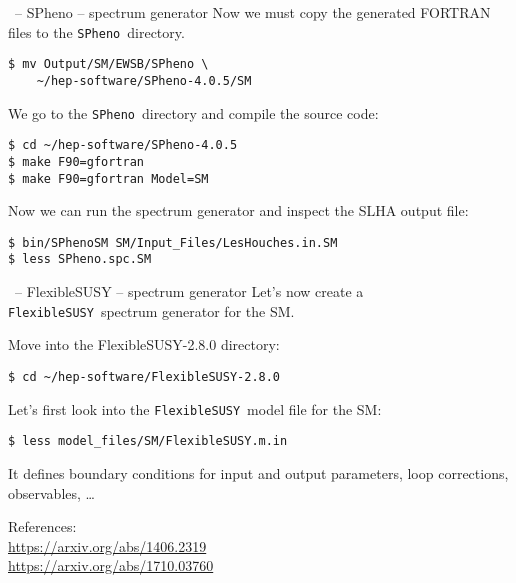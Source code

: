 \documentclass[11pt]{beamer}
\newcommand{\FlexibleSUSY}{\texttt{FlexibleSUSY}}
\newcommand{\SPheno}{\texttt{SPheno}}
\begin{document}
\begin{frame}[fragile]{\insertsection\ -- SPheno -- spectrum generator}
  Now we must copy the generated FORTRAN files to the \SPheno\
  directory.
  \begin{lstlisting}
$ mv Output/SM/EWSB/SPheno \
    ~/hep-software/SPheno-4.0.5/SM\end{lstlisting}%
  We go to the \SPheno\ directory and compile the source code:
  \begin{lstlisting}
$ cd ~/hep-software/SPheno-4.0.5
$ make F90=gfortran
$ make F90=gfortran Model=SM\end{lstlisting}%
  Now we can run the spectrum generator and inspect the SLHA output file:
  \begin{lstlisting}
$ bin/SPhenoSM SM/Input_Files/LesHouches.in.SM
$ less SPheno.spc.SM\end{lstlisting}
\end{frame}


\begin{frame}[fragile]{\insertsection\ -- FlexibleSUSY -- spectrum generator}
  Let's now create a \FlexibleSUSY\ spectrum generator for the SM.

  \bigskip

  Move into the FlexibleSUSY-2.8.0 directory:
  \begin{lstlisting}
$ cd ~/hep-software/FlexibleSUSY-2.8.0\end{lstlisting}%
  Let's first look into the \FlexibleSUSY\ model file for the SM:
  \begin{lstlisting}
$ less model_files/SM/FlexibleSUSY.m.in\end{lstlisting}%
  It defines boundary conditions for input and output parameters, loop
  corrections, observables, \ldots

  \bigskip

  References:\\
  \url{https://arxiv.org/abs/1406.2319}\\
  \url{https://arxiv.org/abs/1710.03760}

\end{frame}

\end{document}

